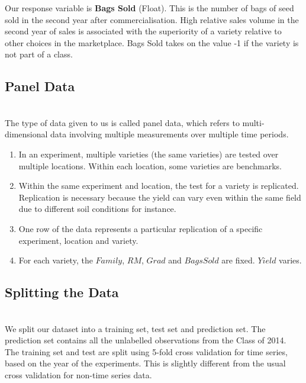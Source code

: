\documentclass[psamsfonts]{amsart}
\begin{document}
 Our response variable is \textbf{Bags Sold} (Float). This is the number of bags of seed sold in the second year after commercialisation. High relative sales volume in the second year of sales is associated with the superiority of a variety relative to other choices in the marketplace. Bags Sold takes on the value -1 if the variety is not part of a class. \\ 

\subsection*{Panel Data}
\hfill \\

The type of data given to us is called panel data, which refers to multi-dimensional data involving multiple measurements over multiple time periods.\\
\begin{enumerate}
\item In an experiment, multiple varieties (the same varieties) are tested over multiple locations. Within
each location, some varieties are benchmarks.
\item Within the same experiment and location, the test for a variety is replicated. Replication is necessary
because the yield can vary even within the same field due to different soil conditions for instance.
\item  One row of the data represents a particular replication of a specific experiment, location and variety.
\item For each variety, the $Family$, $RM$, $Grad$ and $BagsSold$ are fixed. $Yield$ varies. \\
\end{enumerate}

\subsection*{Splitting the Data}
\hfill \\

We split our dataset into a training set, test set and prediction set. The prediction set contains all the unlabelled observations from the Class of 2014.\\

The training set and test are split using 5-fold cross validation for time series, based on the year of the experiments.  This is slightly different from the usual cross validation for non-time series data.\\
\end{document}
